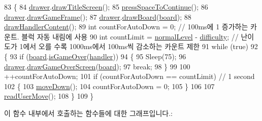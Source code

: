 \begin{DoxyCode}
83     \{
84         \mbox{\hyperlink{class_game_a045e1468514c0c0d51e968364e0678ad}{drawer}}.\mbox{\hyperlink{class_drawer_ad87ca95db3cafee6f005e297e2c6d4de}{drawTitleScreen}}(); 
85         \mbox{\hyperlink{class_game_a00e70c3fa536c8b76e92aaca66c5ccc2}{pressSpaceToContinue}}();
86         \mbox{\hyperlink{class_game_a045e1468514c0c0d51e968364e0678ad}{drawer}}.\mbox{\hyperlink{class_drawer_a9f5e10f6175710be253244d6f80ebcf7}{drawGameFrame}}();
87         \mbox{\hyperlink{class_game_a045e1468514c0c0d51e968364e0678ad}{drawer}}.\mbox{\hyperlink{class_drawer_af26df40487cb2de033887b5342d94b5a}{drawBoard}}(\mbox{\hyperlink{class_game_af5bc546b0c766ecf2f7e008f750832ed}{board}});
88         \mbox{\hyperlink{class_game_aa61075838d60bc5c850b72bc4804b7b8}{drawHandlerContent}}();
89         \textcolor{keywordtype}{int} countForAutoDown = 0;                   \textcolor{comment}{// 100ms에 1 증가하는 카운트. 블럭 자동 내림에 사용}
90         \textcolor{keywordtype}{int} countLimit = \mbox{\hyperlink{tetris__game_8h_aca9e87e8e4e22a94653954e21e81c939}{normalLevel}} - \mbox{\hyperlink{class_game_a536a6390d16f05d402928bd731e06ef3}{difficulty}};  \textcolor{comment}{// 난이도가 1에서 오를 수록 1000ms에서 100ms씩
       감소하는 카운트 제한}
91         \textcolor{keywordflow}{while} (\textcolor{keyword}{true})
92         \{
93             \textcolor{keywordflow}{if} (\mbox{\hyperlink{class_game_af5bc546b0c766ecf2f7e008f750832ed}{board}}.\mbox{\hyperlink{class_board_a538ca2c02fbccf3af07ed3c821d9a736}{isGameOver}}(\mbox{\hyperlink{class_game_ae72b7259125e83dfd258c6a132394eec}{handler}}))
94             \{
95                 Sleep(75);
96                 \mbox{\hyperlink{class_game_a045e1468514c0c0d51e968364e0678ad}{drawer}}.\mbox{\hyperlink{class_drawer_a57ec099eb46c93f20d9221a2244dd9a7}{drawGameOverScreen}}(\mbox{\hyperlink{class_game_af5bc546b0c766ecf2f7e008f750832ed}{board}});
97                 \textcolor{keywordflow}{break};
98             \}
99             
100             ++countForAutoDown;
101             \textcolor{keywordflow}{if} (countForAutoDown == countLimit) \textcolor{comment}{// 1 second}
102             \{
103                 \mbox{\hyperlink{class_game_af379862400da53dd8f296f0990c0953f}{moveDown}}();
104                 countForAutoDown = 0;
105             \}
106 
107             \mbox{\hyperlink{class_game_aeb128045605ef167c233da9f993d407d}{readUserMove}}();
108         \}
109     \}
\end{DoxyCode}
이 함수 내부에서 호출하는 함수들에 대한 그래프입니다.\+:
\nopagebreak
